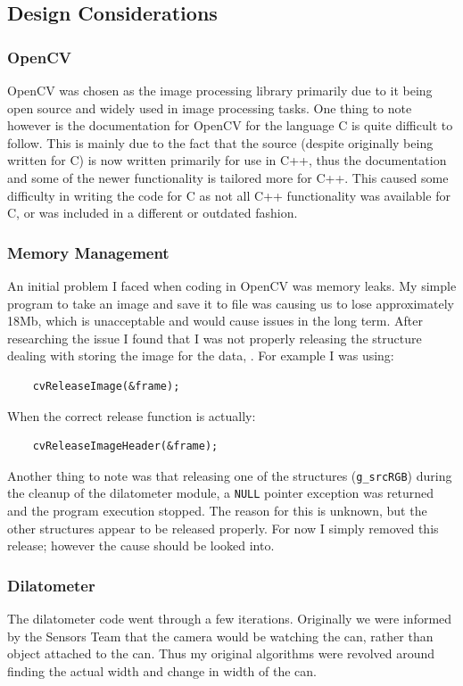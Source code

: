 \subsection{Design Considerations}

\subsubsection{OpenCV}

OpenCV was chosen as the image processing library primarily due to it being open source and widely used in image processing tasks.  
One thing to note however is the documentation for OpenCV for the language C is quite difficult to follow.  This is mainly due to the fact that the source (despite originally being written for C) is now written primarily for use in C++, thus the documentation and some of the newer functionality is tailored more for C++.  This caused some difficulty in writing the code for C as not all C++ functionality was available for C, or was included in a different or outdated fashion. 

\subsubsection{Memory Management}

An initial problem I faced when coding in OpenCV was memory leaks.  My simple program to take an image and save it to file was causing us to lose approximately 18Mb, which is unacceptable and would cause issues in the long term.  After researching the issue I found that I was not properly releasing the structure dealing with storing the image for the data, .  For example I was using:
\begin{lstlisting}
	cvReleaseImage(&frame);
\end{lstlisting}
When the correct release function is actually:
\begin{lstlisting}
	cvReleaseImageHeader(&frame);
\end{lstlisting}

Another thing to note was that releasing one of the  structures (\verb/g_srcRGB/) during the cleanup of the dilatometer module, a \verb/NULL/ pointer exception was returned and the program execution stopped.  The reason for this is unknown, but the other  structures appear to be released properly. For now I simply removed this release; however the cause should be looked into.

\subsubsection{Dilatometer}
The dilatometer code went through a few iterations.  Originally we were informed by the Sensors Team that the camera would be watching the can, rather than object attached to the can.  Thus my original algorithms were revolved around finding the actual width and change in width of the can.

